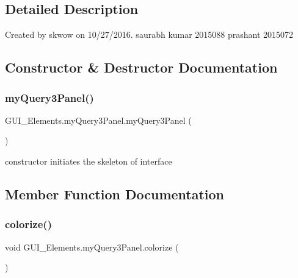 \subsection{Detailed Description}
Created by skwow on 10/27/2016. saurabh kumar 2015088 prashant 2015072 

\subsection{Constructor \& Destructor Documentation}
\hypertarget{class_g_u_i___elements_1_1my_query3_panel_a6d672bacf210e53a00e148a27a4ea2b8}{}\label{class_g_u_i___elements_1_1my_query3_panel_a6d672bacf210e53a00e148a27a4ea2b8} 
\subsubsection{\texorpdfstring{my\+Query3\+Panel()}{myQuery3Panel()}}
{\footnotesize\ttfamily G\+U\+I\+\_\+\+Elements.\+my\+Query3\+Panel.\+my\+Query3\+Panel (\begin{DoxyParamCaption}{ }\end{DoxyParamCaption})}



constructor initiates the skeleton of interface 



\subsection{Member Function Documentation}
\hypertarget{class_g_u_i___elements_1_1my_query3_panel_ad3c37661350b9ed95d749ca33450ff69}{}\label{class_g_u_i___elements_1_1my_query3_panel_ad3c37661350b9ed95d749ca33450ff69} 
\subsubsection{\texorpdfstring{colorize()}{colorize()}}
{\footnotesize\ttfamily void G\+U\+I\+\_\+\+Elements.\+my\+Query3\+Panel.\+colorize (\begin{DoxyParamCaption}{ }\end{DoxyParamCaption})}

